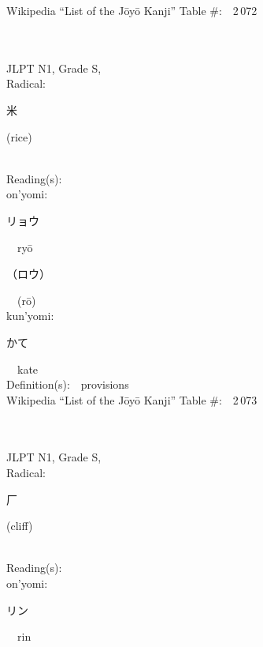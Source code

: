\begin{multicols}{2}
Wikipedia ``List of the J\=oy\=o Kanji'' Table \#:\ \ 2\,072 \\
\ \ \\
{\fontsize{34pt}{40pt}  }\ \ \\
{JLPT N1, Grade S, \\Radical:\ \ {\begin{CJK}{UTF8}{min} 米 \end{CJK}} (rice) } \\
Reading(s):\ \ \\
{\hspace*{1em}}on'yomi:\ \ \\
{\hspace*{2em}}{\begin{CJK}{UTF8}{min} リョウ \end{CJK}}\ \ ry\=o\ \ \\
{\hspace*{2em}}{\begin{CJK}{UTF8}{min} （ロウ） \end{CJK}}\ \ (r\=o)\ \ \\
{\hspace*{1em}}kun'yomi:\ \ \\
{\hspace*{2em}}{\begin{CJK}{UTF8}{min} かて \end{CJK}}\ \ kate\ \ \\
Definition(s):\ \ provisions \\
Wikipedia ``List of the J\=oy\=o Kanji'' Table \#:\ \ 2\,073 \\
\ \ \\
{\fontsize{34pt}{40pt}  }\ \ \\
{JLPT N1, Grade S, \\Radical:\ \ {\begin{CJK}{UTF8}{min} 厂 \end{CJK}} (cliff) } \\
Reading(s):\ \ \\
{\hspace*{1em}}on'yomi:\ \ \\
{\hspace*{2em}}{\begin{CJK}{UTF8}{min} リン \end{CJK}}\ \ rin\ \ \\

\end{multicols}
